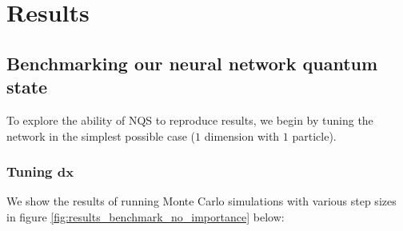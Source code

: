 \documentclass[a4paper, 10pt]{article}
\begin{document}
 	\section{Results}
	\subsection{Benchmarking our neural network quantum state}
	 To explore the ability of NQS to reproduce results, we begin by tuning the network in the simplest possible case ($1$ dimension with $1$ particle).
	 \subsubsection{Tuning $\boldsymbol{dx}$}
	 We show the results of running Monte Carlo simulations with various step sizes in figure \ref{fig:results_benchmark_no_importance} below:
\end{document}
